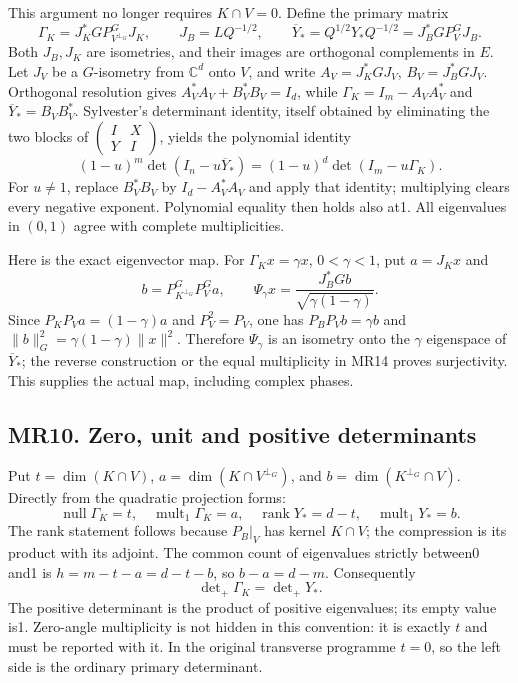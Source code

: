 \documentclass[11pt]{article}
\begin{document}
This argument no longer requires \(K\cap V=0\). Define the primary matrix \[
 \Gamma_K=J_K^*GP_{V^{\perp_G}}^GJ_K,\qquad
 J_B=LQ^{-1/2},\qquad
 \overline Y_*=Q^{1/2}Y_*Q^{-1/2}=J_B^*GP_V^GJ_B .
\tag{MR13}
\] Both \(J_B,J_K\) are isometries, and their images are orthogonal complements in \(E\). Let \(J_V\) be a \(G\)-isometry from \(\mathbb C^d\) onto \(V\), and write \(A_V=J_K^*GJ_V\), \(B_V=J_B^*GJ_V\). Orthogonal resolution gives \(A_V^*A_V+B_V^*B_V=I_d\), while \(\Gamma_K=I_m-A_VA_V^*\) and \(\overline Y_*=B_VB_V^*\). Sylvester's determinant identity, itself obtained by eliminating the two blocks of \(\left(\begin{smallmatrix}I&X\\Y&I\end{smallmatrix}\right)\), yields the polynomial identity \[
 \boxed{(1-u)^m\det(I_n-u\overline Y_*)
       =(1-u)^d\det(I_m-u\Gamma_K).}
\tag{MR14}
\] For \(u\ne1\), replace \(B_V^*B_V\) by \(I_d-A_V^*A_V\) and apply that identity; multiplying clears every negative exponent. Polynomial equality then holds also at1. All eigenvalues in \((0,1)\) agree with complete multiplicities.

Here is the exact eigenvector map. For \(\Gamma_Kx=\gamma x\), \(0<\gamma<1\), put \(a=J_Kx\) and \[
 b=P_{K^{\perp_G}}^G P_V^G a,\qquad
 \Psi_\gamma x=\frac{J_B^*Gb}{\sqrt{\gamma(1-\gamma)}}.
\tag{MR15}
\] Since \(P_KP_Va=(1-\gamma)a\) and \(P_V^2=P_V\), one has \(P_BP_Vb=\gamma b\) and \(\|b\|_G^2=\gamma(1-\gamma)\|x\|^2\). Therefore \(\Psi_\gamma\) is an isometry onto the \(\gamma\) eigenspace of \(\overline Y_*\); the reverse construction or the equal multiplicity in MR14 proves surjectivity. This supplies the actual map, including complex phases.

\subsection{MR10. Zero, unit and positive determinants}\label{mr10.-zero-unit-and-positive-determinants}

Put \(t=\dim(K\cap V)\), \(a=\dim(K\cap V^{\perp_G})\), and \(b=\dim(K^{\perp_G}\cap V)\). Directly from the quadratic projection forms: \[
 \operatorname{null}\Gamma_K=t,\quad
 \operatorname{mult}_1\Gamma_K=a,\quad
 \operatorname{rank}Y_*=d-t,\quad
 \operatorname{mult}_1Y_*=b.
\tag{MR16}
\] The rank statement follows because \(P_B|_V\) has kernel \(K\cap V\); the compression is its product with its adjoint. The common count of eigenvalues strictly between0 and1 is \(h=m-t-a=d-t-b\), so \(b-a=d-m\). Consequently \[
 \boxed{\det\nolimits_+\Gamma_K=\det\nolimits_+Y_* .}
\tag{MR17}
\] The positive determinant is the product of positive eigenvalues; its empty value is1. Zero-angle multiplicity is not hidden in this convention: it is exactly \(t\) and must be reported with it. In the original transverse programme \(t=0\), so the left side is the ordinary primary determinant.
\end{document}
